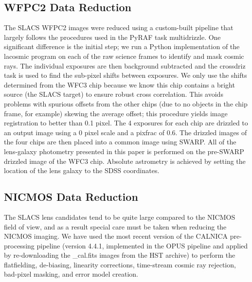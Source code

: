 \documentclass[iop]{emulateapj}
\begin{document}
\subsection{WFPC2 Data Reduction}
The SLACS WFPC2 images were reduced using a custom-built pipeline that largely follows the procedures used in the PyRAF task {\sc multidrizzle}. One significant difference is the initial step; we run a Python implementation of the {\sc lacosmic} program on each of the raw science frames to identify and mask cosmic rays. The individual exposures are then background subtracted and the {\sc crossdriz} task is used to find the sub-pixel shifts between exposures. We only use the shifts determined from the WFC3 chip because we know this chip contains a bright source (the SLACS target) to ensure robust cross correlation. This avoids problems with spurious offsets from the other chips (due to no objects in the chip frame, for example) skewing the average offset; this procedure yields image registration to better than 0.1 pixel. The 4 exposures for each chip are drizzled to an output image using a 0 pixel scale and a pixfrac of 0.6. The drizzled images of the four chips are then placed into a common image using SWARP. All of the lens-galaxy photometry presented in this paper is performed on the pre-SWARP drizzled image of the WFC3 chip. Absolute astrometry is achieved by setting the location of the lens galaxy to the SDSS coordinates.


\subsection{NICMOS Data Reduction}
The SLACS lens candidates tend to be quite large compared to the NICMOS field of view, and as a result special care must be taken when reducing the NICMOS imaging. We have used the most recent version of the CALNICA pre-processing pipeline (version 4.4.1, implemented in the OPUS pipeline and applied by re-downloading the \_cal.fits images from the HST archive) to perform the flatfielding, de-biasing, linearity corrections, time-stream cosmic ray rejection, bad-pixel masking, and error model creation.
\end{document}
